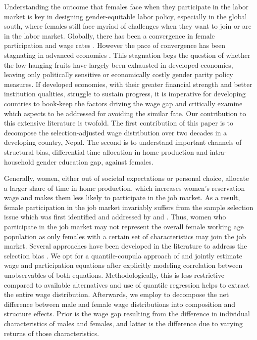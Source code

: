 Understanding the outcome that females face when they participate in the labor market is key in designing gender-equitable labor policy, especially in the global south, where females still face myriad of challenges when they want to join or are in the labor market. Globally, there has been a convergence in female participation and wage rates \parencite{WEF2020, OECD2023}. However the pace of convergence has been stagnating in advanced economies \parencite{Blau2017}. This stagnation begs the question of whether the low-hanging fruits have largely been exhausted in developed economies, leaving only politically sensitive or economically costly gender parity policy measures. If developed economies, with their greater financial strength and better institution qualities, struggle to sustain progress, it is imperative for developing countries to book-keep the factors driving the wage gap and critically examine which aspects to be addressed for avoiding the similar fate. Our contribution to this extensive literature is twofold. The first contribution of this paper is to decompose the selection-adjusted wage distribution over two decades in a developing country, Nepal. The second is to understand important channels of structural bias, differential time allocation in home production and intra-household gender education gap, against females.\par


Generally, women, either out of societal expectations or personal choice, allocate a larger share of time in home production, which increases women's reservation wage and makes them less likely to participate in the job market. As a result, female participation in the job market invariably suffers from the sample selection issue which was first identified and addressed by \textcite{Heckman1974} and \textcite{Gronau1974}. Thus, women who participate in the job market may not represent the overall female working age population as only females with a certain set of characteristics may join the job market. Several approaches have been developed in the literature  to address the selection bias \parencite{Buchinsky1998, Blau2006, Blundell2007, Mulligan2008, Huber2015, Bar2015, Maasoumi2017, Arellano2017}. We opt for a quantile-coupula approach of \textcite{Arellano2017} and jointly estimate wage and participation equations after explicitly modeling correlation between unobservables of both equations. Methodologically, this is less restrictive compared to available alternatives and use of quantile regression helps to extract the entire wage distribution. Afterwards, we employ \textcite{Chernozhukov2013} to decompose the net difference between male and female wage distributions into composition and structure effects. Prior is the wage gap resulting from the difference in individual characteristics of males and females, and latter is the difference due to varying returns of those characteristics.\par   


